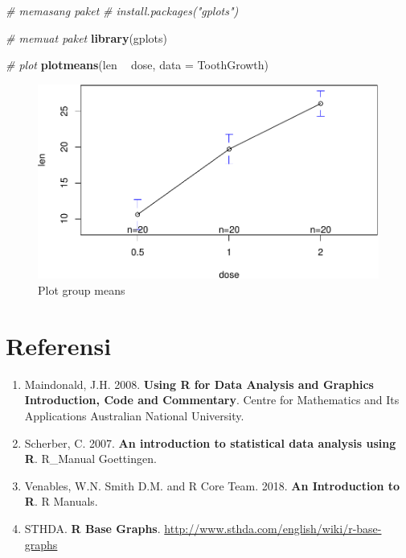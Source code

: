 \documentclass[]{book}
\newenvironment{Shaded}{\begin{snugshade}}{\end{snugshade}}
\newcommand{\KeywordTok}[1]{\textcolor[rgb]{0.13,0.29,0.53}{\textbf{#1}}}
\newcommand{\DataTypeTok}[1]{\textcolor[rgb]{0.13,0.29,0.53}{#1}}
\newcommand{\StringTok}[1]{\textcolor[rgb]{0.31,0.60,0.02}{#1}}
\newcommand{\CommentTok}[1]{\textcolor[rgb]{0.56,0.35,0.01}{\textit{#1}}}
\newcommand{\OperatorTok}[1]{\textcolor[rgb]{0.81,0.36,0.00}{\textbf{#1}}}
\newcommand{\NormalTok}[1]{#1}
\providecommand{\tightlist}{%
  \setlength{\itemsep}{0pt}\setlength{\parskip}{0pt}}
\begin{document}
\begin{Shaded}
\begin{Highlighting}[]
\CommentTok{# memasang paket}
\CommentTok{# install.packages("gplots")}

\CommentTok{# memuat paket}
\KeywordTok{library}\NormalTok{(gplots)}

\CommentTok{# plot}
\KeywordTok{plotmeans}\NormalTok{(len }\OperatorTok{~}\StringTok{ }\NormalTok{dose, }\DataTypeTok{data =}\NormalTok{ ToothGrowth)}
\end{Highlighting}
\end{Shaded}

\begin{figure}

{\centering \includegraphics[width=0.7\linewidth]{EnvStat_files/figure-latex/plotmeans-1} 

}

\caption{Plot group means}\label{fig:plotmeans}
\end{figure}

\section{Referensi}\label{referensi-3}

\begin{enumerate}
\def\labelenumi{\arabic{enumi}.}
\tightlist
\item
  Maindonald, J.H. 2008. \textbf{Using R for Data Analysis and Graphics
  Introduction, Code and Commentary}. Centre for Mathematics and Its
  Applications Australian National University.
\item
  Scherber, C. 2007. \textbf{An introduction to statistical data
  analysis using R}. R\_Manual Goettingen.
\item
  Venables, W.N. Smith D.M. and R Core Team. 2018. \textbf{An
  Introduction to R}. R Manuals.
\item
  STHDA. \textbf{R Base Graphs}.
  \url{http://www.sthda.com/english/wiki/r-base-graphs}
\end{enumerate}
\end{document}
